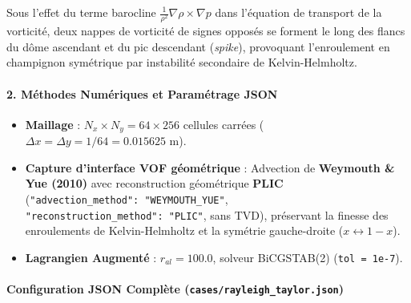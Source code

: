 \documentclass[
  10pt,
]{article}
\providecommand{\tightlist}{%
  \setlength{\itemsep}{0pt}\setlength{\parskip}{0pt}}
\begin{document}
Sous l'effet du terme barocline
\(\frac{1}{\rho^2} \nabla \rho \times \nabla p\) dans l'équation de
transport de la vorticité, deux nappes de vorticité de signes opposés se
forment le long des flancs du dôme ascendant et du pic descendant
(\emph{spike}), provoquant l'enroulement en champignon symétrique par
instabilité secondaire de Kelvin-Helmholtz.

\paragraph{2. Méthodes Numériques et Paramétrage
JSON}\label{muxe9thodes-numuxe9riques-et-paramuxe9trage-json-8}

\begin{itemize}
\tightlist
\item
  \textbf{Maillage} : \(N_x \times N_y = 64 \times 256\) cellules
  carrées (\(\Delta x = \Delta y = 1/64 = 0.015625\text{ m}\)).
\item
  \textbf{Capture d'interface VOF géométrique} : Advection de
  \textbf{Weymouth \& Yue (2010)} avec reconstruction géométrique
  \textbf{PLIC} (\texttt{"advection\_method":\ "WEYMOUTH\_YUE"},
  \texttt{"reconstruction\_method":\ "PLIC"}, sans TVD), préservant la
  finesse des enroulements de Kelvin-Helmholtz et la symétrie
  gauche-droite (\(x \leftrightarrow 1-x\)).
\item
  \textbf{Lagrangien Augmenté} : \(r_{al} = 100.0\), solveur BiCGSTAB(2)
  (\texttt{tol\ =\ 1e-7}).
\end{itemize}

\paragraph{\texorpdfstring{Configuration JSON Complète
(\texttt{cases/rayleigh\_taylor.json})}{Configuration JSON Complète (cases/rayleigh\_taylor.json)}}\label{configuration-json-compluxe8te-casesrayleigh_taylor.json}
\end{document}
